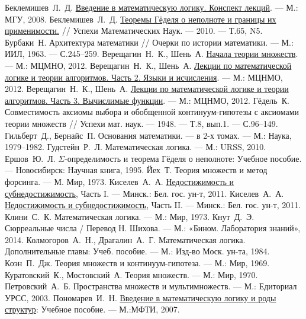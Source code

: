 \begin{thebibliography}{199}
 Беклемишев~Л.~Д. \href{http://lpcs.math.msu.su/vml2008/}{Введение в математическую логику. Конспект лекций}. --- М.: МГУ, 2008.
 Беклемишев~Л.~Д. \href{http://www.mi-ras.ru/~bekl/Papers/goedel-uspehi.pdf}{Теоремы Гёделя о неполноте
и границы их применимости.} // Успехи Математических Наук. --- 2010. --- Т.65, N5.
 Бурбаки~Н. Архитектура математики // Очерки по истории математики. --- М.: ИИЛ, 1963. --- С.245--259.
 Верещагин~Н.~К., Шень~А. \href{https://www.mccme.ru/free-books/shen/shen-logic-part1-2.pdf}{Начала теории множеств}. --- М.: МЦМНО, 2012. 
 Верещагин~Н.~К., Шень~А. \href{http://math-info.hse.ru/f/2014-15/CompLingMasters/Vereshchagin-Shen2.pdf}{Лекции по математической логике и теории алгоритмов. Часть 2. Языки и исчисления}. --- М.: МЦНМО, 2012.
 Верещагин~Н.~К., Шень~А. \href{http://www.mcnmo.ru/free-books/shen/shen-logic-part3-2.pdf}{Лекции по математической логике и теории алгоритмов. Часть 3. Вычислимые функции}. --- М.: МЦНМО, 2012.
 Гёдель~К. Совместимость аксиомы выбора и обобщенной континуум-гипотезы с аксиомами теории множеств // Успехи мат.
наук. --- 1948. --- Т.8, вып.1. --- С.96--149.
 Гильберт~Д., Бернайс~П. Основания математики. ---  в 2-х томах. --- М.: Наука, 1979--1982.
 Гудстейн~Р.~Л. Математическая логика. --- М.: URSS, 2010.
 Ершов~Ю.~Л. $\Sigma$-определимость и теорема Гёделя о неполноте: Учебное
пособие. --- Новосибирск: Научная книга, 1995.
 Йех~Т. Теория множеств и метод форсинга. --- М. Мир, 1973.
 Киселев~А.~А. \href{https://arxiv.org/pdf/1110.0642.pdf}{Недостижимость и субнедостижимость},
Часть I. --- Минск.: Бел. гос. ун-т, 2011.
 Киселев~А.~А. \href{https://arxiv.org/pdf/1110.0643.pdf}{Недостижимость и субнедостижимость},
Часть II. --- Минск.: Бел. гос. ун-т, 2011.
 Клини~С.~К. Математическая логика. --- М.: Мир, 1973.
 Кнут~Д.~Э. Сюрреальные числа / Перевод Н. Шихова. --- М.: «Бином. Лаборатория знаний», 2014.
 Колмогоров~А.~Н., Драгалин~А.~Г. Математическая логика. Дополнительные главы: Учеб. пособие. --- М.: Изд-во Моск. ун-та, 1984.
 Коэн~П.~Дж. Теория множеств и континуум-гипотеза. --- М.: Мир, 1969.
 Куратовский~К., Мостовский~А. Теория множеств. --- М.: Мир, 1970.
 Петровский~А.~Б. Пространства множеств и мультимножеств. --- М.: Едиториал УРСС, 2003.
 Пономарев~И.~Н. \href{http://inponomarev.ru/math.pdf}{Введение в математическую логику и роды структур}: Учебное пособие. --- М.:МФТИ, 2007.

\end{thebibliography}
